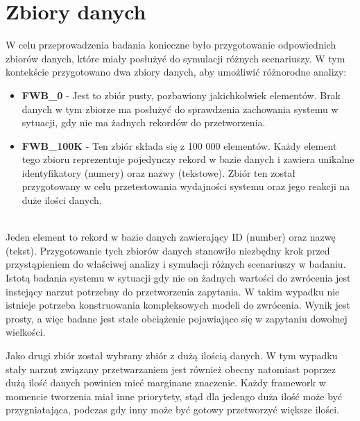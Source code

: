 \section{Zbiory danych}

W celu przeprowadzenia badania konieczne było przygotowanie odpowiednich zbiorów danych, które miały posłużyć do symulacji różnych scenariuszy.
W tym kontekście przygotowano dwa zbiory danych, aby umożliwić różnorodne analizy:

\begin{itemize}
  \item \textbf{FWB\_0} - Jest to zbiór pusty, pozbawiony jakichkolwiek elementów. Brak danych w tym zbiorze ma posłużyć do sprawdzenia zachowania systemu w sytuacji, gdy nie ma żadnych rekordów do przetworzenia.
  \item \textbf{FWB\_100K} - Ten zbiór składa się z 100 000 elementów. Każdy element tego zbioru reprezentuje pojedynczy rekord w bazie danych i zawiera unikalne identyfikatory (numery) oraz nazwy (tekstowe). Zbiór ten został przygotowany w celu przetestowania wydajności systemu oraz jego reakcji na duże ilości danych.
\end{itemize}
\phantom
\\
Jeden element to rekord w bazie danych zawierający ID (number) oraz nazwę (tekst).
Przygotowanie tych zbiorów danych stanowiło niezbędny krok przed przystąpieniem do właściwej analizy i symulacji różnych scenariuszy w badaniu. 
Istotą badania systemu w sytuacji gdy nie on żadnych wartości do zwrócenia jest instejący narzut potrzebny do przetworzenia zapytania.
W takim wypadku nie istnieje potrzeba konstruowania kompleksowych modeli do zwrócenia.
Wynik jest prosty, a więc badane jest stałe obciążenie pojawiające się w zapytaniu dowolnej wielkości.

Jako drugi zbiór został wybrany zbiór z dużą ilością danych.
W tym wypadku stały narzut związany przetwarzaniem jest również obecny natomiast poprzez dużą ilość danych powinien mieć marginane znaczenie.
Każdy framework w momencie tworzenia miał inne priorytety, stąd dla jedengo duża ilość może być przygniatająca, podczas gdy inny może być gotowy przetworzyć większe ilości.